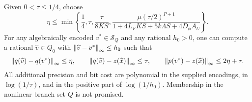 \begin{lemma}
\label{lem:accuracy-recovery}
Given $0<\tau\le1/4$, choose
\begin{equation}\label{eq:accuracy-general-tolerance}
 \eta\le\min\left\{\frac14,\tau,\frac{\tau}{8KS},
 \frac{\mu(\tau/2)^{P+1}}
              {1+4L_FKS+5k\Lambda S+4D_\phi A_U}\right\}.
\end{equation}
For any algebraically encoded $v^*\in\mathcal S_Q$ and any rational
$h_0>0$, one can compute a rational $\widehat v\in Q_0$ with
$\left\lVert\widehat v-v^*\right\rVert_\infty\le h_0$ such that
\begin{equation}\label{eq:accuracy-recovery-interface}
 \left\lVert q(\widehat v)-q(v^*)\right\rVert_\infty\le\eta,\qquad
 \left\lVert q(\widehat v)-z(\widehat x)\right\rVert_\infty\le\tau,\qquad
 \left\lVert p(v^*)-z(\widehat x)\right\rVert_\infty\le2\eta+\tau.
\end{equation}
All additional precision and bit cost are polynomial in the supplied
encodings, in $\log(1/\tau)$, and in the positive part of
$\log(1/h_0)$.
Membership in the nonlinear branch set $Q$ is not promised.
\end{lemma}
